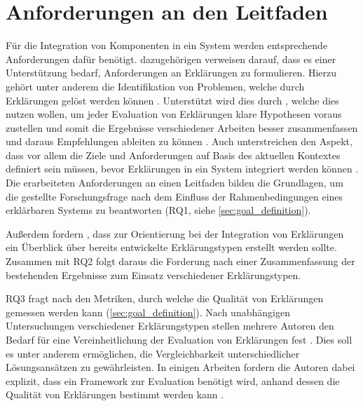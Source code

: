 \section{Anforderungen an den Leitfaden}


Für die Integration von Komponenten in ein System werden entsprechende Anforderungen dafür benötigt. dazugehörigen verweisen \citeauthor{chazette_end-users_nodate} darauf, dass es einer Unterstützung bedarf, Anforderungen an Erklärungen zu formulieren. Hierzu gehört unter anderem die Identifikation von Problemen, welche durch Erklärungen gelöst werden können \cite{chazette_end-users_nodate, doshi2017towards}. Unterstützt wird dies durch \citeauthor{waa_evaluating_2021}, welche dies nutzen wollen, um jeder Evaluation von Erklärungen klare Hypothesen voraus zustellen und somit die Ergebnisse verschiedener Arbeiten besser zusammenfassen und daraus Empfehlungen ableiten zu können \cite{waa_evaluating_2021}. Auch \citeauthor{kohl_explainability_2019} unterstreichen den Aspekt, dass vor allem die Ziele und Anforderungen auf Basis des aktuellen Kontextes definiert sein müssen, bevor Erklärungen in ein System integriert werden können \cite{kohl_explainability_2019}. Die erarbeiteten Anforderungen an einen Leitfaden bilden die Grundlagen, um die gestellte Forschungsfrage nach dem Einfluss der Rahmenbedingungen eines erklärbaren Systems zu beantworten (RQ1, siehe \autoref{sec:goal_definition}).

Außerdem fordern \citeauthor{waa_evaluating_2021}, dass zur Orientierung bei der Integration von Erklärungen ein Überblick über bereits entwickelte Erklärungstypen erstellt werden sollte. Zusammen mit RQ2 folgt daraus die Forderung nach einer Zusammenfassung der bestehenden Ergebnisse zum Einsatz verschiedener Erklärungstypen.

RQ3 fragt nach den Metriken, durch welche die Qualität von Erklärungen gemessen werden kann (\autoref{sec:goal_definition}). Nach unabhängigen Untersuchungen verschiedener Erklärungstypen stellen mehrere Autoren den Bedarf für eine Vereinheitlichung der Evaluation von Erklärungen fest \cite{cirqueira_scenario-based_2020,zahedi_towards_2019, nunes_systematic_2017, martin_evaluating_2021}. Dies soll es unter anderem ermöglichen, die Vergleichbarkeit unterschiedlicher Lösungsansätzen zu gewährleisten. In einigen Arbeiten fordern die Autoren dabei explizit, dass ein Framework zur Evaluation benötigt wird, anhand dessen die Qualität von Erklärungen bestimmt werden kann \cite{nunes_systematic_2017,sokol_explainability_2020,chari_explanation_2020}.

